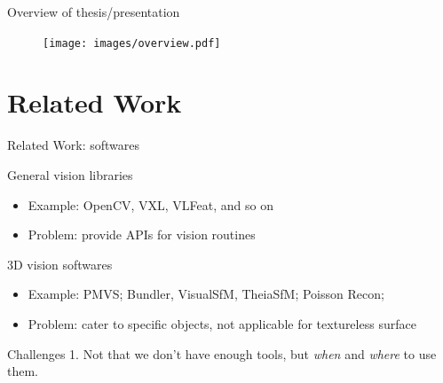 \documentclass[10pt]{beamer}
\begin{document}



\begin{frame}{Overview of thesis/presentation}

\begin{figure}
\centering
\texttt{[image: images/overview.pdf]}
\end{figure}

\end{frame}

\section{Related Work}
\begin{frame}{Related Work: softwares}


\begin{exampleblock}{General vision libraries}
\begin{itemize}
  \item Example: OpenCV, VXL, VLFeat, and so on
  \item Problem: provide APIs for vision routines
\end{itemize}
\end{exampleblock}

\begin{exampleblock}{3D vision softwares}
  \begin{itemize}
    \item Example: PMVS; Bundler, VisualSfM, TheiaSfM; Poisson Recon;
    \item Problem: cater to specific objects, not applicable for textureless surface
  \end{itemize}
\end{exampleblock}

\begin{alertblock}{Challenges}
1. Not that we don't have enough tools, but \textit{when} and \textit{where} to use them. \\
\end{alertblock}

\end{frame}
\end{document}
